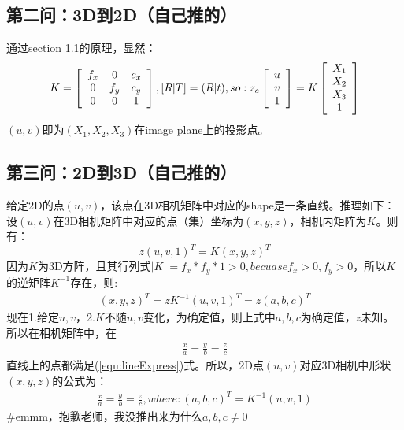 \documentclass[UTF8]{ctexart}
\begin{document}
\subsection{第二问：3D到2D（自己推的）}
通过section 1.1的原理，显然：
\begin{align*}
K = \left [ \begin{array}{ c c c}
f_x & 0   & c_x \\
0  & f_y & c_y \\
0  & 0   & 1 \\
\end{array} \right ],
[R|T]=(R|t), so:
 z_c \left[ \begin{array}{c}  u \\ v \\ 1 \end{array} \right] =
 K \left[ \begin{array}{c}   X_1 \\  X_2 \\  X_3 \\ 1  \end{array}\right]
\end{align*}
$(u,v)$即为$(X_1,X_2,X_3)$在image plane上的投影点。
\subsection{第三问：2D到3D（自己推的）}
给定2D的点$(u,v)$，该点在3D相机矩阵中对应的shape是一条直线。推理如下：
设$(u,v)$在3D相机矩阵中对应的点（集）坐标为$(x,y,z)$，相机内矩阵为$K$。则有：
$$z(u,v,1)^T=K(x,y,z)^T$$
因为$K$为3D方阵，且其行列式$|K|=f_x*f_y*1>0, becuase f_x>0, f_y>0$，所以$K$的逆矩阵$K^{-1}$存在，则:
\begin{align}
(x,y,z)^T=zK^{-1}(u,v,1)^T=z(a,b,c)^T\label{equ:lineExpress}
\end{align}
现在1.给定$u,v$，2.$K$不随$u,v$变化，为确定值，则上式中$a,b,c$为确定值，$z$未知。所以在相机矩阵中，在
\begin{align}
\frac{x}{a}=\frac{y}{b}=\frac{z}{c}
\end{align}
直线上的点都满足(\ref{equ:lineExpress})式。所以，2D点$(u,v)$对应3D相机中形状$(x,y,z)$的公式为：
\begin{align}
\frac{x}{a}=\frac{y}{b}=\frac{z}{c},where:(a,b,c)^T=K^{-1}(u,v,1)
\end{align}
\#emmm，抱歉老师，我没推出来为什么$a,b,c\neq0$
\end{document}
